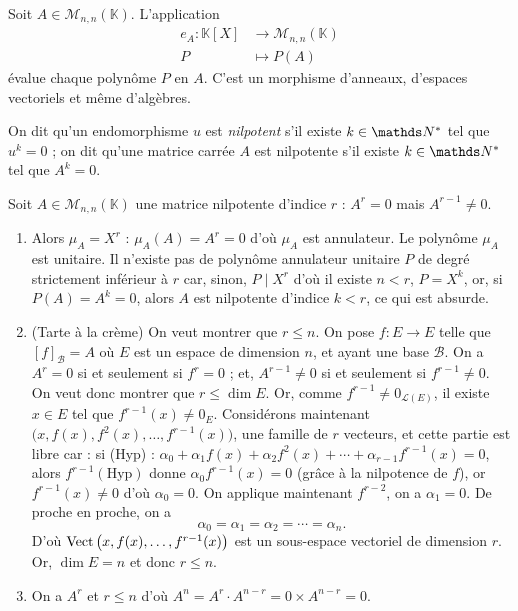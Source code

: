 \begin{rmk}
	Soit $A \in \mathscr{M}_{n,n}(\mathds{K})$. L'application \begin{align*}
		e_A: \mathds{K}[X] &\longrightarrow \mathscr{M}_{n,n}(\mathds{K}) \\
		P &\longmapsto P(A)
	\end{align*} évalue chaque polynôme $P$\/ en $A$. C'est un morphisme d'anneaux, d'espaces vectoriels et même d'algèbres.
\end{rmk}

\begin{defn}
	On dit qu'un endomorphisme $u$\/ est {\it nilpotent}\/ s'il existe $k \in \N^*$\/ tel que $u^k = 0$\/ ; on dit qu'une matrice carrée $A$\/ est nilpotente s'il existe $k \in \N^*$\/ tel que $A^k = 0$.
\end{defn}

\begin{exo}
	Soit $A \in \mathscr{M}_{n,n}(\mathds{K})$\/ une matrice nilpotente d'indice $r$ : $A^r = 0$\/ mais $A^{r-1} \neq 0$.
	\begin{enumerate}
		\item Alors $\mu_A = X^r$\/ : $\mu_A(A) = A^r = 0$\/ d'où $\mu_A$\/ est annulateur. Le polynôme $\mu_A$\/ est unitaire.
			Il n'existe pas de polynôme annulateur unitaire $P$\/ de degré strictement inférieur à $r$\/ car, sinon, $P  \mid X^r$\/ d'où il existe $n < r$, $P = X^k$, or, si $P(A) = A^k = 0$, alors $A$\/ est nilpotente d'indice $k < r$, ce qui est absurde.
		\item {\color{cyan}(Tarte à la crème)} On veut montrer que $r \le n$.
			On pose $f: E \to E$\/ telle que $[f]_\mathscr{B} = A$\/ où $E$\/ est un espace de dimension $n$, et ayant une base $\mathscr{B}$.
			On a $A^r = 0$\/ si et seulement si $f^r = 0$\/ ; et, $A^{r-1} \neq 0$\/ si et seulement si $f^{r-1} \neq 0$.
			On veut donc montrer que $r \le \dim E$.
			Or, comme $f^{r-1} \neq 0_{\mathscr{L}(E)}$, il existe $x \in E$\/ tel que $f^{r-1}(x) \neq 0_E$.
			Considérons maintenant $\big(x, f(x), f^2(x), \ldots, f^{r-1}(x)\big)$, une famille de $r$\/ vecteurs, et cette partie est libre car : si (Hyp) : $\alpha_0 + \alpha_1 f(x) + \alpha_2 f^2(x) + \cdots + \alpha_{r-1} f^{r-1}(x) = 0$, alors $f^{r-1}(\text{Hyp})$\/ donne $\alpha_0 f^{r-1}(x) = 0$\/ (grâce à la nilpotence de $f$), or $f^{r-1}(x) \neq 0$\/ d'où $\alpha_0 = 0$. On applique maintenant $f^{r-2}$, on a $\alpha_1 = 0$. De proche en proche, on a \[
				\alpha_0 = \alpha_1 = \alpha_2 = \cdots = \alpha_n
			.\]
			D'où $\operatorname{Vect}\big(x, f(x), \ldots, f^{r-1}(x)\big)$\/ est un sous-espace vectoriel de dimension $r$. Or, $\dim E = n$\/ et donc $r \le n$.
		\item On a $A^r$\/ et $r \le n$\/ d'où $A^n = A^r \cdot A^{n-r} = 0 \times A^{n-r} = 0$.
	\end{enumerate}
\end{exo}

